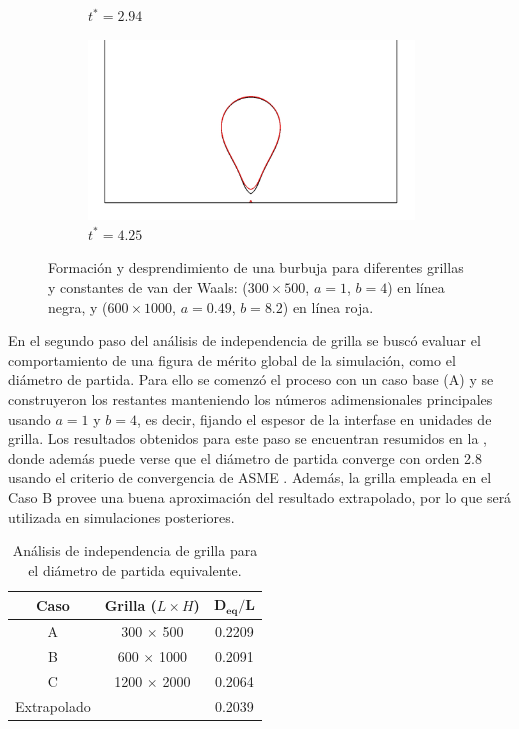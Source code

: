 \begin{figure}[htb]
\begin{subfigure}[t]{0.45\textwidth}
        \caption{$t^* = 2.94$}
    \end{subfigure}    
    \begin{subfigure}[t]{0.45\textwidth}
        \centering
        \includegraphics[width=0.95\textwidth]{Imagenes/HetBoiling/GridIndep_1/130}
        \caption{$t^* = 4.25$}
    \end{subfigure}    
    \caption{Formaci\'on y desprendimiento de una burbuja para diferentes grillas y constantes de van der Waals: ($300 \times 500$, $a=1$, $b=4$) en l\'inea negra, y ($600 \times 1000$, $a=0.49$, $b=8.2$) en l\'inea roja.}
    \label{fig:bubble2D_step1}
\end{figure}

En el segundo paso del an\'alisis de independencia de grilla se busc\'o evaluar el comportamiento de una figura de m\'erito global de la simulaci\'on, como el di\'ametro de partida. Para ello se comenz\'o el proceso con un caso base (A) y se construyeron los restantes manteniendo los n\'umeros adimensionales principales usando $a=1$ y $b=4$, es decir, fijando el espesor de la interfase en unidades de grilla. Los resultados obtenidos para este paso se encuentran resumidos en la , donde adem\'as puede verse que el di\'ametro de partida converge con orden 2.8 usando el criterio de convergencia de ASME \cite{freitas_asmes_2003}. Adem\'as, la grilla empleada en el Caso B provee una buena aproximaci\'on del resultado extrapolado, por lo que ser\'a utilizada en simulaciones posteriores.

\begin{table}[ht]
	\centering
    \begin{tabular}{c c c}
	    \toprule
        \bf Caso & \bf Grilla ($L\times H$) & $\bm{D_{eq}/L}$  \\
        \midrule
		A & 300  $\times$ 500  &  0.2209 \\
		B & 600  $\times$ 1000 &  0.2091 \\		
		C & 1200 $\times$ 2000 &  0.2064 \\		
		Extrapolado &          &  0.2039 \\		
        \bottomrule
	\end{tabular}
	\caption{An\'alisis de independencia de grilla para el di\'ametro de partida equivalente.}
	\label{tab:gridindep_step2}
\end{table} 